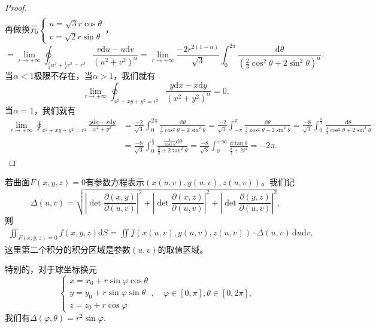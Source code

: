 \documentclass[../../main.tex]{subfiles}%
\begin{document}
\begin{proof}
\begin{align*}
\end{align*}
再做换元$\begin{cases}u=\sqrt3 r\cos\theta\\v=\sqrt2 r\sin\theta\end{cases}$，
\[
=\lim_{r\to+\infty}\oint_{\frac32u^2+\frac12v^2=r^2}\frac{v\mathrm{d}u-u\mathrm{d}v}{(u^2+v^2)^\alpha}
=\lim_{r\to+\infty}\frac{-2r^{2(1-\alpha)}}{\sqrt3}\int_{0}^{2\pi}\frac{\mathrm{d}\theta}{\left(\frac23\cos^2\theta+2\sin^2\theta\right)^\alpha}.
\]
当$\alpha<1$极限不存在，当$\alpha>1$，我们就有
\[
\lim_{r\to+\infty}\oint_{x^2+xy+y^2=r^2}\frac{y\mathrm{d}x-x\mathrm{d}y}{(x^2+y^2)^\alpha}=0.
\]
当$\alpha=1$，我们就有
\begin{align*}
\lim_{r\to+\infty}\oint_{x^2+xy+y^2=r^2}\frac{y\mathrm{d}x-x\mathrm{d}y}{x^2+y^2}
&=\frac{-2}{\sqrt3}\int_{0}^{2\pi}\frac{\mathrm{d}\theta}{\frac23\cos^2\theta+2\sin^2\theta}
=\frac{-2}{\sqrt3}\int_{-\pi}^{\pi}\frac{\mathrm{d}\theta}{\frac23\cos^2\theta+2\sin^2\theta}
=\frac{-8}{\sqrt3}\int_{0}^{\frac{\pi}{2}}\frac{\mathrm{d}\theta}{\frac23\cos^2\theta+2\sin^2\theta}\\
&=\frac{-8}{\sqrt3}\int_{0}^{\frac{\pi}{2}}\frac{\frac1{\cos^2\theta}\mathrm{d}\theta}{\frac23+2\tan^2\theta}
=\frac{-8}{\sqrt3}\int_{0}^{+\infty}\frac{\mathrm{d}\tan\theta}{\frac23+2t^2}
=-2\pi.
\end{align*}
\end{proof}

\begin{theorem}[第一类曲面积分的参数方程法]\label{theorem:第一类曲面积分的参数方程法}
若曲面$F(x,y,z)=0$有参数方程表示$(x(u,v),y(u,v),z(u,v))$。我们记
\[
\Delta(u,v)=\sqrt{\left|\det \frac{\partial(x,y)}{\partial(u,v)}\right|^2+\left|\det \frac{\partial(x,z)}{\partial(u,v)}\right|^2+\left|\det \frac{\partial(y,z)}{\partial(u,v)}\right|^2},
\]
则
\begin{align*}
\iint_{F(x,y,z)=0} f(x,y,z)\mathrm{d}S=\iint f(x(u,v),y(u,v),z(u,v))\cdot \Delta(u,v)\,\mathrm{d}u\mathrm{d}v,
\end{align*}
这里第二个积分的积分区域是参数$(u,v)$的取值区域。
\end{theorem}
\begin{remark}
特别的，对于球坐标换元
\[
\begin{cases}
x=x_0+r\sin\varphi\cos\theta\\
y=y_0+r\sin\varphi\sin\theta\\
z=z_0+r\cos\varphi
\end{cases},\quad \varphi\in[0,\pi],\theta\in[0,2\pi],
\]
我们有$\Delta(\varphi,\theta)=r^2\sin\varphi$.
\end{remark}
\end{document}
